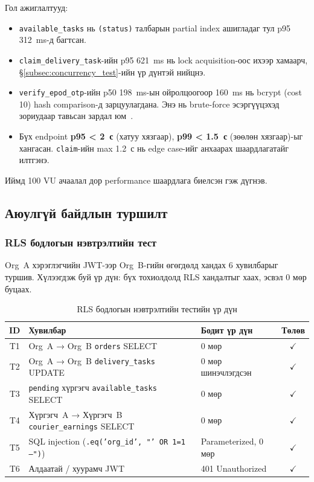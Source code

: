 Гол ажиглалтууд:
\begin{itemize}
  \item \texttt{available\_tasks} нь \texttt{(status)} талбарын partial index ашигладаг тул p95 312~ms-д багтсан.
  \item \texttt{claim\_delivery\_task}-ийн p95 621~ms нь lock acquisition-оос ихээр хамаарч, \S\ref{subsec:concurrency_test}-ийн үр дүнтэй нийцнэ.
  \item \texttt{verify\_epod\_otp}-ийн p50 198~ms-ын ойролцоогоор 160~ms нь bcrypt (cost 10) hash comparison-д зарцуулагдана. Энэ нь brute-force эсэргүүцэхэд зориудаар тавьсан зардал юм~\cite{provos1999bcrypt}.
  \item Бүх endpoint \textbf{p95 < 2~с} (хатуу хязгаар), \textbf{p99 < 1.5~с} (зөөлөн хязгаар)-ыг хангасан. \texttt{claim}-ийн max 1.2~с нь edge case-ийг анхаарах шаардлагатайг илтгэнэ.
\end{itemize}
Иймд 100 VU ачаалал дор performance шаардлага биелсэн гэж дүгнэв.

\subsection{Аюулгүй байдлын туршилт}
\label{subsec:security_test}

\subsubsection{RLS бодлогын нэвтрэлтийн тест}

Org~A хэрэглэгчийн JWT-ээр Org~B-гийн өгөгдөлд хандах 6 хувилбарыг туршив. Хүлээгдэж буй үр дүн: бүх тохиолдолд RLS хандалтыг хаах, эсвэл 0 мөр буцаах.

\begin{table}[H]
\centering
\renewcommand{\arraystretch}{1.25}
\caption{RLS бодлогын нэвтрэлтийн тестийн үр дүн}
\label{tab:rls_pentest}
\footnotesize
\begin{tabular}{|c|p{7cm}|p{4cm}|c|}
\hline
\textbf{ID} & \textbf{Хувилбар} & \textbf{Бодит үр дүн} & \textbf{Төлөв} \\
\hline
T1 & Org~A → Org~B \texttt{orders} SELECT & 0 мөр & $\checkmark$ \\
\hline
T2 & Org~A → Org~B \texttt{delivery\_tasks} UPDATE & 0 мөр шинэчлэгдсэн & $\checkmark$ \\
\hline
T3 & \texttt{pending} хүргэгч \texttt{available\_tasks} SELECT & 0 мөр & $\checkmark$ \\
\hline
T4 & Хүргэгч~A → Хүргэгч~B \texttt{courier\_earnings} SELECT & 0 мөр & $\checkmark$ \\
\hline
T5 & SQL injection (\texttt{.eq('org\_id', "' OR 1=1 --")}) & Parameterized, 0 мөр & $\checkmark$ \\
\hline
T6 & Алдаатай / хуурамч JWT & 401 Unauthorized & $\checkmark$ \\
\hline
\end{tabular}
\end{table}

